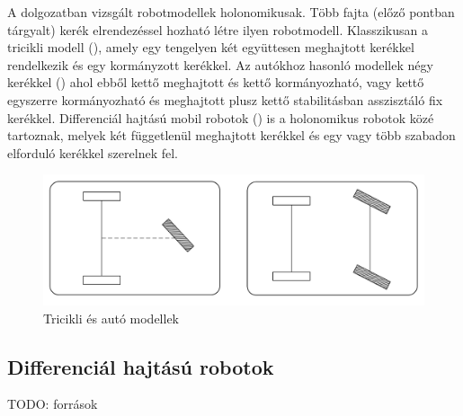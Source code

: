 A dolgozatban vizsgált robotmodellek holonomikusak. Több fajta (előző pontban tárgyalt) kerék elrendezéssel hozható létre ilyen robotmodell. Klasszikusan a tricikli modell (), amely egy tengelyen két együttesen meghajtott kerékkel rendelkezik és egy kormányzott kerékkel. Az autókhoz hasonló modellek négy kerékkel () ahol ebből kettő meghajtott és kettő kormányozható, vagy kettő egyszerre kormányozható és meghajtott plusz kettő stabilitásban asszisztáló fix kerékkel. Differenciál hajtású mobil robotok () is a holonomikus robotok közé tartoznak, melyek két függetlenül meghajtott kerékkel és egy vagy több szabadon elforduló kerékkel szerelnek fel.  \cite{siciliano2010robotics} \cite{ros2_control_docs}

\begin{figure}[!ht]
    \centering
    \includegraphics[width=150mm, keepaspectratio]{figures/024_tricikli_car.png}
    \caption{Tricikli és autó modellek \cite{siciliano2010robotics}}
    \label{fig:024_tricikli_car}
\end{figure}

\subsection{Differenciál hajtású robotok}
TODO: források


